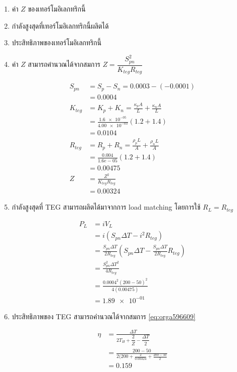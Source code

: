 \documentclass[a4paper,nobib,openany,10pt]{tufte-book}
\begin{document}
\begin{enumerate}
\item ค่า \(Z\) ของเทอร์โมอิเลกทริกนี้

\item กำลังสูงสุดที่เทอร์โมอิเลกทริกนี้ผลิตได้

\item ประสิทธิภาพของเทอร์โมอิเลกทริกนี้

\item ค่า \(Z\) สามารถคำนวณได้จากสมการ
\(Z = \dfrac{S_{pn}^2}{K_{teg} R_{teg}}\)

\begin{align*}
S_{pn} &= S_p - S_n =0.0003- (-0.0001) \\
&= 0.0004\\
K_{teg} &= K_p + K_n = \frac{\kappa_p A}{L} + \frac{\kappa_n A}{L} \\
&= \frac{ \num{1.6e-05}}{ \num{4.00e-03}} \left(1.2+1.4\right) \\
&=0.0104\\
R_{teg} &= R_p + R_n = \frac{\rho_p L}{A} + \frac{\rho_n L}{A} \\
&= \frac{0.004}{1.6e-05} \left(\num{1.2}+\num{1.4}\right) \\
&=0.00475\\
Z &= \frac{Z^2}{K_{teg}R_{teg}} \\
&=0.00324
\end{align*}

\item กำลังสูงสุดที่ TEG สามารถผลิตได้มาจากการ load matching โดยการใช้
\(R_L = R_{teg}\)

\begin{align*}
P_L &= i V_L \\
&= i \left( S_{pn} \Delta T - i^2 R_{teg} \right) \\
&= \frac{S_{pn} \Delta T}{2 R_{teg}} \left( S_{pn} \Delta T -  \frac{S_{pn} \Delta T}{2 R_{teg}} R_{teg} \right) \\
&= \frac{ S_{pn}^2 \Delta T^2 }{4 R_{teg}} \\
&= \frac{0.0004^2 (200 - 50)^2}{4 (0.00475)} \\
&=\num{1.89e-01}
\end{align*}

\item ประสิทธิภาพของ TEG สามารถคำนวณได้จากสมการ
\ref{eq:orga596609}

\begin{align*}
\eta &= \frac{ \Delta T }{ 2 T_H + \dfrac{2}{Z} - \dfrac{ \Delta T }{ 2 } } \\
&= \frac{200-50}{ 2(200 + \frac{2}{0.00324} + \frac{200-50}{2}} \\
&=0.159
\end{align*}
\end{enumerate}
\end{document}
